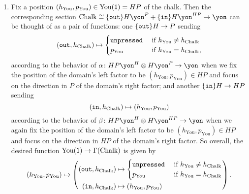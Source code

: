 \documentclass[Book-Poly]{subfiles}
\begin{document}
\begin{exercise}
\begin{solution}
\begin{enumerate}
    \item Fix a position $(h_\text{You},p_\text{You})\in\operatorname{You}(\textsf{1})=HP$ of the chalk.
    Then the corresponding section $\text{Chalk}\iso\{\const{out}\}H\yon^P + \{\const{in}\}H\yon^{HP}\to\yon$ can be thought of as a pair of functions: one $\{\texttt{out}\}H\to P$ sending
    \[
        (\texttt{out},h_\text{Chalk})\mapsto
            \begin{cases}
  	            \texttt{unpressed} & \textnormal{ if } h_\text{You} \neq h_\text{Chalk} \\
  	            p_\text{You} & \textnormal{ if } h_\text{You} = h_\text{Chalk},
            \end{cases}
    \]
    according to the behavior of $\alpha\colon HP\yon^H\otimes H\yon^P\to\yon$ when we fix the position of the domain's left factor to be $(h_\text{You},p_\text{You})\in HP$ and focus on the direction in $P$ of the domain's right factor; and another $\{\texttt{in}\}H\to HP$ sending
    \[
        (\texttt{in},h_\text{Chalk})\mapsto(h_\text{You},p_\text{You})
    \]
    according to the behavior of $\beta\colon HP\yon^H\otimes H\yon^{HP}\to\yon$ when we again fix the position of the domain's left factor to be $(h_\text{You},p_\text{You})\in HP$ and focus on the direction in $HP$ of the domain's right factor.
    So overall, the desired function $\operatorname{You}(\textsf{1})\to\Gamma(\text{Chalk})$ is given by
    \[
        (h_\text{You},p_\text{You})\mapsto\left(
            \begin{aligned}
                (\texttt{out},h_\text{Chalk})&\mapsto
                    \begin{cases}
          	            \texttt{unpressed} & \textnormal{ if } h_\text{You} \neq h_\text{Chalk} \\
          	            p_\text{You} & \textnormal{ if } h_\text{You} = h_\text{Chalk}
                    \end{cases} \\
                (\texttt{in},h_\text{Chalk})&\mapsto(h_\text{You},p_\text{You})
            \end{aligned}
        \right).
    \]
\end{enumerate}
\end{solution}
\end{exercise}
\end{document}
